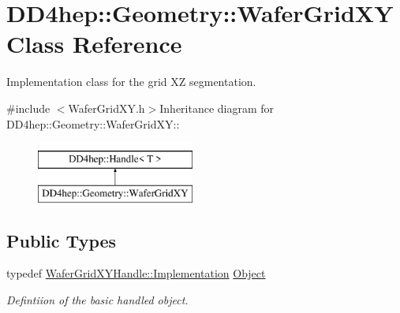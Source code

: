 \hypertarget{class_d_d4hep_1_1_geometry_1_1_wafer_grid_x_y}{
\section{DD4hep::Geometry::WaferGridXY Class Reference}
\label{class_d_d4hep_1_1_geometry_1_1_wafer_grid_x_y}
}


Implementation class for the grid XZ segmentation.  


{\ttfamily \#include $<$WaferGridXY.h$>$}Inheritance diagram for DD4hep::Geometry::WaferGridXY::\begin{figure}[H]
\begin{center}
\leavevmode
\includegraphics[height=2cm]{class_d_d4hep_1_1_geometry_1_1_wafer_grid_x_y}
\end{center}
\end{figure}
\subsection*{Public Types}
\begin{DoxyCompactItemize}
\item 
typedef \hyperlink{class_t}{WaferGridXYHandle::Implementation} \hyperlink{class_d_d4hep_1_1_geometry_1_1_wafer_grid_x_y_a94a234312cc2c123569319d3d33b24e0}{Object}
\begin{DoxyCompactList}\small\item\em Defintiion of the basic handled object. \item\end{DoxyCompactList}\end{DoxyCompactItemize}
